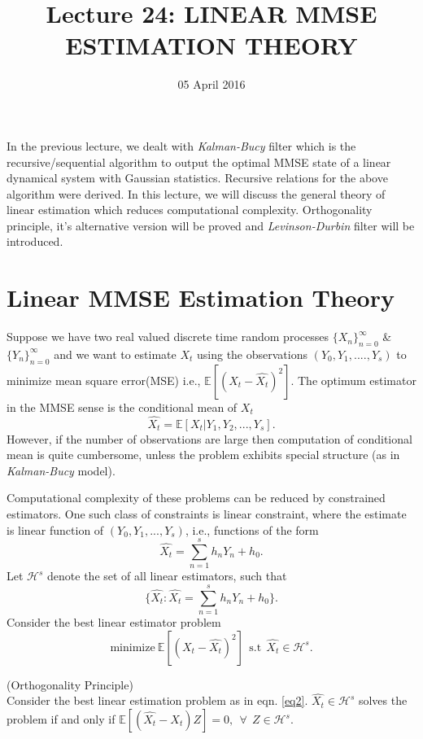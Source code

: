 \documentclass[a4paper,english,12pt]{article}
\begin{document}
\title{Lecture 24: LINEAR MMSE ESTIMATION THEORY}
\author{}
\date{05 April 2016}
\maketitle
In the previous lecture, we dealt with \textit{Kalman-Bucy} filter which is the recursive/sequential algorithm to output the optimal MMSE state of a linear dynamical system with Gaussian statistics. Recursive relations for the above algorithm were derived. In this lecture, we will discuss the general theory of linear estimation which reduces computational complexity. Orthogonality principle, it's alternative version will be proved and \textit{Levinson-Durbin} filter will be introduced. 
\section{Linear MMSE Estimation Theory}
Suppose we have two real valued discrete time random processes 
$\{X_n\}_{n=0}^\infty$ \& $\{Y_n\}_{n=0}^\infty$ and we want to estimate $X_t$ using the observations $(Y_0,Y_1,....,Y_s)$ to minimize mean square error(MSE) i.e., $\mathbb{E}[(X_t-\hat{X_t})^2]$. The optimum estimator in the MMSE sense is  the conditional mean of $X_t$
\begin{equation}
\hat{X_t}=\mathbb{E}[X_t|Y_1,Y_2,...,Y_s].
\end{equation}
However, if the number of observations are large then computation of conditional mean is quite cumbersome, unless the problem exhibits special structure (as in \textit{Kalman-Bucy} model).
\par Computational complexity of these problems can be reduced by constrained estimators. One such class of constraints is linear constraint, where the estimate is linear function of $(Y_0,Y_1,...,Y_s)$, i.e., functions of the form 
\begin{equation}
\hat{X_t}=\sum_{n=1}^s h_nY_n+h_0.
\end{equation}
Let $\mathcal{H}^s$ denote the set of all linear estimators, such that
\begin{equation}
\{\hat{X_t}:\hat{X_t}=\sum_{n=1}^s h_nY_n+h_0\}\label{eq1}.
\end{equation}
Consider the best linear estimator problem 
\begin{equation}
\mbox{minimize}~\mathbb{E}[(X_t-\hat{X_t})^2]~~\mbox{s.t}~~\hat{X_t}\in \mathcal{H}^s. \label{eq2}
\end{equation}
\begin{thm}{(Orthogonality Principle)}\\
Consider the best linear estimation problem as in eqn. \eqref{eq2}. $\hat{X_t}\in \mathcal{H}^s$ solves the problem if and only if $\mathbb{E}[(\hat{X_t}-X_t)Z]=0,~~\forall~~Z \in \mathcal{H}^s$.
\end{thm}
\end{document}
